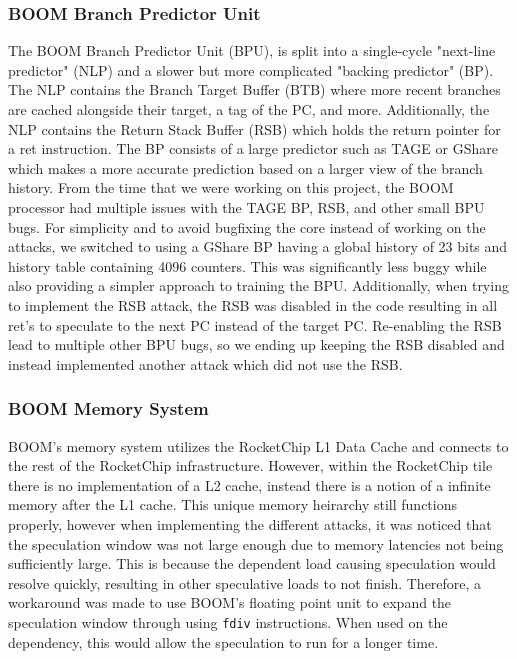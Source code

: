 \subsubsection{BOOM Branch Predictor Unit}

The BOOM Branch Predictor Unit (BPU), is split into a single-cycle "next-line predictor" (NLP) and a
slower but more complicated "backing predictor" (BP). The NLP contains the Branch Target Buffer (BTB) 
where more recent branches are cached alongside their target, a tag of the PC, and more. Additionally,
the NLP contains the Return Stack Buffer (RSB) which holds the return pointer for a ret instruction. The BP
consists of a large predictor such as TAGE or GShare which makes a more accurate prediction based on
a larger view of the branch history. From the time that we were working on this project, the BOOM 
processor had multiple issues with the TAGE BP, RSB, and other small BPU bugs. For simplicity and 
to avoid bugfixing the core instead of working on the attacks, we switched to using a GShare BP
having a global history of 23 bits and history table containing 4096 counters. This was significantly
less buggy while also providing a simpler approach to training the BPU. Additionally, when trying to
implement the RSB attack, the RSB was disabled in the code resulting in all ret's to speculate to
the next PC instead of the target PC. Re-enabling the RSB lead to multiple other BPU bugs, so we
ending up keeping the RSB disabled and instead implemented another attack which did not use the RSB.

\subsubsection{BOOM Memory System}

BOOM's memory system utilizes the RocketChip L1 Data Cache and connects to the rest of the RocketChip
infrastructure. However, within the RocketChip tile there is no implementation of a L2 cache, instead
there is a notion of a infinite memory after the L1 cache. This unique memory heirarchy still functions
properly, however when implementing the different attacks, it was noticed that the speculation window
was not large enough due to memory latencies not being sufficiently large. This is because the
dependent load causing speculation would resolve quickly, resulting in other speculative loads to not
finish. Therefore, a workaround was made to use BOOM's floating point unit to expand the speculation 
window through using {\tt fdiv} instructions. When used on the dependency, this would allow the speculation
to run for a longer time.



